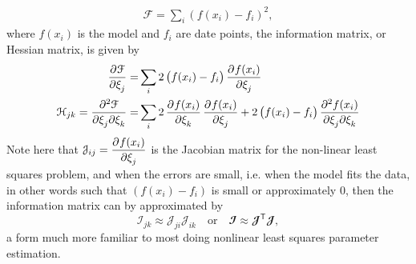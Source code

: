 \begin{equation}
\begin{aligned}
\mathcal{F} = \sum_i \left(f(x_i) - f_i\right)^2,
\end{aligned}
\end{equation}
where $f(x_i)$ is the model and $f_i$ are date points, the information matrix, or Hessian matrix, is given by 
\begin{equation}\label{eqn:hessianmatrix}
\begin{aligned}
\dpd{\mathcal{F}}{\xi_j} =& \sum_i 2\left(f(x_i) - f_i\right)\dpd{f(x_i)}{\xi_j}	\\
\mathcal{H}_{jk} = \dmd{\mathcal{F}}{2}{\xi_j}{}{\xi_k}{} =& \sum_i 2\dpd{f(x_i)}{\xi_k}\dpd{f(x_i)}{\xi_j}	+ 2\left(f(x_i) - f_i\right)\dmd{f(x_i)}{2}{\xi_j}{}{\xi_k}{}
\end{aligned}
\end{equation}
Note here that $\mathcal{J}_{ij} = \dpd{f(x_i)}{\xi_j}$ is the Jacobian matrix for the non-linear least squares problem, and when the errors are small, i.e. when the model fits the data, in other words such that $\left(f(x_i) - f_i\right)$ is small or approximately 0, then the information matrix can by approximated by  
\begin{equation}
\mathcal{I}_{jk} \approx \mathcal{J}_{ji}\mathcal{J}_{ik} \quad \mathrm{or} \quad
\mathbfcal{I} \approx \mathbfcal{J}^\mathsf{T}\mathbfcal{J},
\end{equation}
a form much more familiar to most doing nonlinear least squares parameter estimation. 


